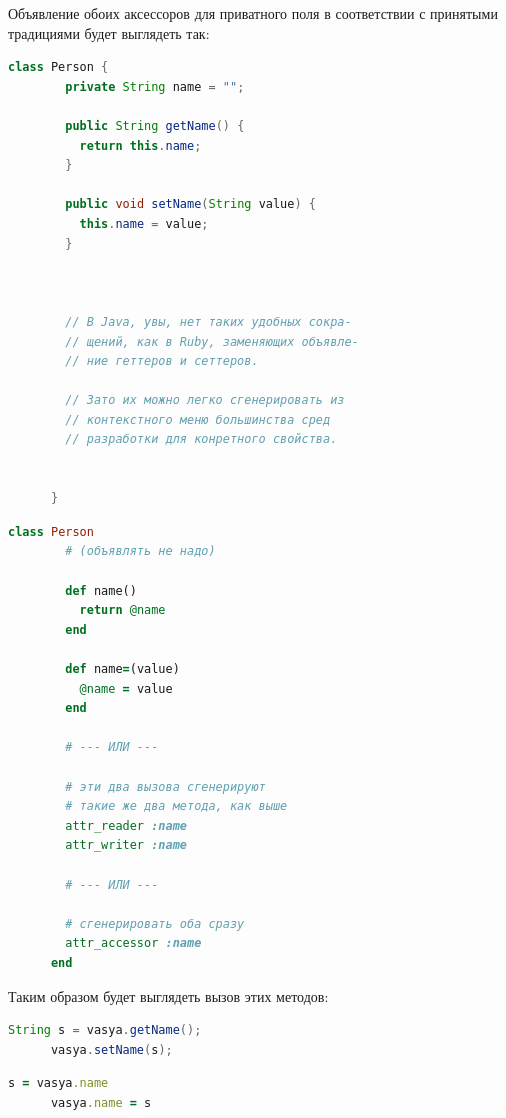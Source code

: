\documentclass[a4paper, 14pt, titlepage]{extarticle}
\newenvironment{halfpage}%
    {\noindent\begin{minipage}[h]{0.49\linewidth}} %
    {\end{minipage}\hfill}
\begin{document}
  Объявление обоих аксессоров для приватного поля в соответствии с принятыми традициями будет
  выглядеть так:

  \begin{halfpage}
    \begin{lstlisting}[language=Java, title={Геттеры/сеттеры в Java}, gobble=6, texcl]
      class Person {
        private String name = "";
        
        public String getName() {
          return this.name;
        }

        public void setName(String value) {
          this.name = value;
        }



        // В Java, увы, нет таких удобных сокра-
        // щений, как в Ruby, заменяющих объявле-
        // ние геттеров и сеттеров.

        // Зато их можно легко сгенерировать из
        // контекстного меню большинства сред
        // разработки для конретного свойства.


      }
    \end{lstlisting}
  \end{halfpage}
  \begin{halfpage}
    \begin{lstlisting}[language=Ruby, title={Аксессоры в Ruby}, gobble=6, texcl]
      class Person
        # (объявлять не надо)

        def name()
          return @name
        end
        
        def name=(value)
          @name = value
        end

        # --- ИЛИ ---

        # эти два вызова сгенерируют
        # такие же два метода, как выше
        attr_reader :name
        attr_writer :name

        # --- ИЛИ ---

        # сгенерировать оба сразу
        attr_accessor :name
      end
    \end{lstlisting}
  \end{halfpage}

  Таким образом будет выглядеть вызов этих методов:

  \begin{halfpage}
    \begin{lstlisting}[language=Java, title={Вызов геттера/сеттера в Java}, gobble=6, texcl]
      String s = vasya.getName();
      vasya.setName(s);
    \end{lstlisting}
  \end{halfpage}
  \begin{halfpage}
    \begin{lstlisting}[language=Ruby, title={Вызов аксессоров в Ruby}, gobble=6, texcl]
      s = vasya.name
      vasya.name = s
    \end{lstlisting}
  \end{halfpage}
\end{document}
